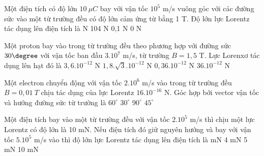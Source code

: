\begin{vidu} %
Một điện tích có độ lớn $10\ \mu C$ bay với vận tốc $10^5$ m/s vuông góc với các đường sức vào một từ trường đều có độ lớn cảm ứng từ bằng 1 T. Độ lớn lực Lorentz tác dụng lên điện tích là
\choice
{ N}
{104 N}
{0,1 N}
{0 N}
\end{vidu}
\begin{vidu} %
	Một proton bay vào trong từ trường đều theo phương hợp với đường sức $30\degree$ với vận tốc ban đầu ${3.10^7}$ m/s, từ trường $B = 1,5$ T. Lực Lorenxơ tác dụng lên hạt đó là
	\choice
	{\True $3,6.10^{-12}$ N}
	{$1,8.\sqrt3 .10^{-12}$ N}
	{$0,36.10^{-12}$ N}
	{$36.10^{-12}$ N}
\end{vidu}
\begin{vidu} %
	Một electron chuyển động với vận tốc $2.10^6$ m/s vào trong từ trường đều $B = 0,01\ T$ chịu tác dụng của lực Lorentz $16.10^{-16}$ N. Góc hợp bởi vector vận tốc và hướng đường sức từ trường là
	\choice
	{$60^\circ$}
	{\True $30^\circ$}
	{$90^\circ$}
	{$45^\circ$}
\end{vidu}
\begin{vidu} %
	Một điện tích bay vào một từ trường đều với vận tốc $2.10^5$ m/s thì chịu một lực Lorentz có độ lớn là 10 mN. Nếu điện tích đó giữ nguyên hướng và bay với vận tốc $5.10^5$ m/s vào thì độ lớn lực Lorentz tác dụng lên điện tích là
	\choice
	{ mN}
	{4 mN}
	{5 mN}
	{10 mN}
\end{vidu}
